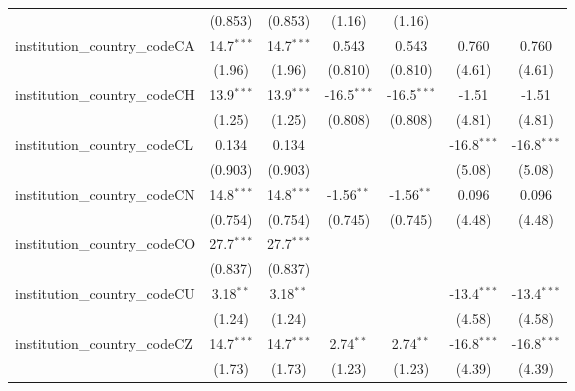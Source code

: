 \begin{tabular}{lcccccc}
                                         & (0.853)       & (0.853)       & (1.16)        & (1.16)        &               &   \\   
   institution\_country\_codeCA          & 14.7$^{***}$  & 14.7$^{***}$  & 0.543         & 0.543         & 0.760         & 0.760\\   
                                         & (1.96)        & (1.96)        & (0.810)       & (0.810)       & (4.61)        & (4.61)\\   
   institution\_country\_codeCH          & 13.9$^{***}$  & 13.9$^{***}$  & -16.5$^{***}$ & -16.5$^{***}$ & -1.51         & -1.51\\   
                                         & (1.25)        & (1.25)        & (0.808)       & (0.808)       & (4.81)        & (4.81)\\   
   institution\_country\_codeCL          & 0.134         & 0.134         &               &               & -16.8$^{***}$ & -16.8$^{***}$\\   
                                         & (0.903)       & (0.903)       &               &               & (5.08)        & (5.08)\\   
   institution\_country\_codeCN          & 14.8$^{***}$  & 14.8$^{***}$  & -1.56$^{**}$  & -1.56$^{**}$  & 0.096         & 0.096\\   
                                         & (0.754)       & (0.754)       & (0.745)       & (0.745)       & (4.48)        & (4.48)\\   
   institution\_country\_codeCO          & 27.7$^{***}$  & 27.7$^{***}$  &               &               &               &   \\   
                                         & (0.837)       & (0.837)       &               &               &               &   \\   
   institution\_country\_codeCU          & 3.18$^{**}$   & 3.18$^{**}$   &               &               & -13.4$^{***}$ & -13.4$^{***}$\\   
                                         & (1.24)        & (1.24)        &               &               & (4.58)        & (4.58)\\   
   institution\_country\_codeCZ          & 14.7$^{***}$  & 14.7$^{***}$  & 2.74$^{**}$   & 2.74$^{**}$   & -16.8$^{***}$ & -16.8$^{***}$\\   
                                         & (1.73)        & (1.73)        & (1.23)        & (1.23)        & (4.39)        & (4.39)\\   

\end{tabular}
